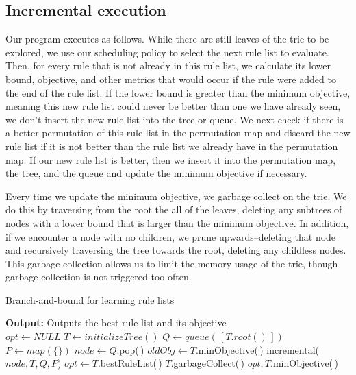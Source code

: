 \documentclass[]{article}
\theoremstyle{definition}
\begin{document}
\subsection{Incremental execution}
Our program executes as follows. 
While there are still leaves of the trie to be explored, we use our scheduling policy to select the next rule list to evaluate.
Then, for every rule that is not already in this rule list, we calculate its lower bound, objective, and other metrics that would occur if the rule were added to the end of the rule list.
If the lower bound is greater than the minimum objective, meaning this new rule list could never be better than one we have already seen, we don't insert the new rule list into the tree or queue.
We next check if there is a better permutation of this rule list in the permutation map and discard the new rule list if it is not better than the rule list we already have in the permutation map.
If our new rule list is better, then we insert it into the permutation map, the tree, and the queue and update the minimum objective if necessary.

Every time we update the minimum objective, we garbage collect on the trie.
We do this by traversing from the root the all of the leaves, deleting any subtrees of nodes with a lower bound that is larger than the minimum objective.
In addition, if we encounter a node with no children, we prune upwards--deleting that node and recursively traversing the tree towards the root, deleting any childless nodes.
This garbage collection allows us to limit the memory usage of the trie, though garbage collection is not triggered too often.

\begin{algorithm}[t!]
  \caption{Branch-and-bound for learning rule lists}
\label{alg:branch-and-bound}
\begin{algorithmic}
\normalsize
\State \textbf{Output:} Outputs the best rule list and its objective\\
\State $opt \gets NULL$
\State $T \gets initializeTree()$
\State $Q \gets queue(\,[T.root()\,])$
\State $P \gets map(\{\})$
	\State $node \gets Q$.pop(\,)
	\State $oldObj \gets T$.minObjective(\,)
	\State incremental($node, T, Q, P$) 
		\State $opt \gets T$.bestRuleList(\,)
		\State $T$.garbageCollect(\,)
	\EndIf
\EndWhile
\State \Return $opt, T$.minObjective(\,)

\end{algorithmic}
\end{algorithm}
\end{document}
